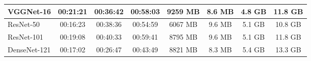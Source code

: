 \documentclass[10pt,journal,compsoc]{IEEEtran}
\begin{document}
\begin{table}[!b]
\begin{adjustbox}{width=\columnwidth}
\begin{tabular}{l|c|c|c|c|c|c|c|}
			\multicolumn{1}{|l|}{VGGNet-16}              & 00:21:21                                                                                       & 00:36:42                                                                         & 00:58:03                 & 9259 MB                                                                    & \multicolumn{1}{c|}{8.6 MB}       & 4.8 GB      & 11.8 GB                                                                                       \\ \hline
			\multicolumn{1}{|l|}{ResNet-50}              & 00:16:23                                                                                       & 00:38:36                                                                         & 00:54:59                 & 6067 MB                                                                    & \multicolumn{1}{c|}{9.6 MB}       & 5.1 GB      & 10.8 GB                                                                                       \\ \hline
			\multicolumn{1}{|l|}{ResNet-101}             & 00:19:08                                                                                       & 00:40:33                                                                         & 00:59:41                 & 8795 MB                                                                    & \multicolumn{1}{c|}{9.6 MB}       & 5.1 GB      & 11.8 GB                                                                                       \\ \hline
			\multicolumn{1}{|l|}{DenseNet-121}           & 00:17:02                                                                                       & 00:26:47                                                                         & 00:43:49                 & 8821 MB                                                                    & \multicolumn{1}{c|}{8.3 MB}       & 5.4 GB      & 13.3 GB                                                                                       \\ \hline
		\end{tabular}
	\end{adjustbox}
\end{table}
\end{document}

